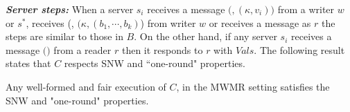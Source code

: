 \textit{\textbf{Server steps:}}  
When a server $s_i$ receives a message $(${\writeValueTag}$, ({\kappa}, v_{i}))$ from a writer $w$ or 
 $s^*$, receives  (\updateCoordTag, $({\kappa}, (b_{1}, \cdots, b_{k})$) from writer $w$ or 
 receives  a message as  {\getTagArrayTag} $r$ the steps are similar to those in $B$. 
On the other hand, if any server $s_i$ receives a message  $(${\readValuesTag}$)$ from a reader $r$ then it responds to $r$ with  $Vals$. 
The following result states that $C$ respects SNW and ``one-round"  properties.

\begin{theorem} Any well-formed  and fair execution of  $C$, in the MWMR setting
  satisfies the SNW and "one-round" properties. %
\end{theorem}

